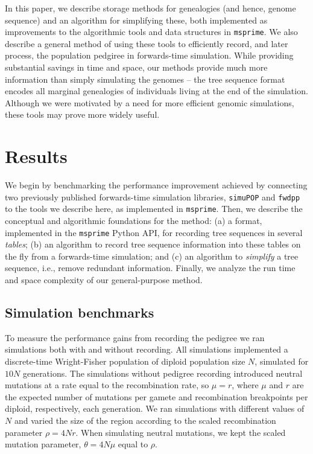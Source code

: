 \documentclass{article}
\newcommand{\simupop}{\texttt{simuPOP}}
\newcommand{\fwdpp}{\texttt{fwdpp}}
\newcommand{\msprime}{\texttt{msprime}}
\begin{document}
In this paper, we describe storage methods for genealogies
(and hence, genome sequence) and an algorithm for simplifying these,
both implemented as improvements to the algorithmic tools and data structures in \msprime{}.
We also describe a general method of using these tools to efficiently record,
and later process, the population pedgiree in forwards-time simulation.
While providing substantial savings in time and space, our methods provide much
more information than simply simulating the genomes -- the tree sequence format
encodes all marginal genealogies of individuals living at the end of the
simulation.
Although we were motivated by a need for more efficient genomic simulations,
these tools may prove more widely useful.


\section*{Results}


We begin by benchmarking the performance improvement achieved by connecting
two previously published forwards-time simulation libraries,
\simupop{} \citep{peng2005simupop} and \fwdpp{} \citep{fwdpp}
to the tools we describe here, as implemented in \msprime{}.
Then, we describe the conceptual and algorithmic foundations for the method:
(a) a format, implemented in the \msprime{} Python API,
for recording tree sequences in several \emph{tables};
(b) an algorithm to record tree sequence information into these tables on the fly
    from a forwards-time simulation;
and (c) an algorithm to \emph{simplify} a tree sequence, i.e., remove redundant information.
Finally, we analyze the run time and space complexity of our general-purpose method.


\subsection*{Simulation benchmarks}

To measure the performance gains from recording the pedigree we ran simulations both with and without recording.
All simulations implemented a discrete-time Wright-Fisher population of diploid
population size $N$, simulated for $10N$ generations.
The simulations without pedigree recording introduced neutral mutations at a rate
equal to the recombination rate,
so $\mu = r$, where $\mu$ and $r$ are the expected number of mutations per gamete and recombination breakpoints per
diploid,
respectively, each generation. 
We ran simulations with different values of $N$ and varied the size of the region according to the scaled recombination
parameter $\rho = 4Nr$.  When simulating neutral mutations, we kept the scaled mutation parameter, $\theta = 4N\mu$
equal to $\rho$.
\end{document}
